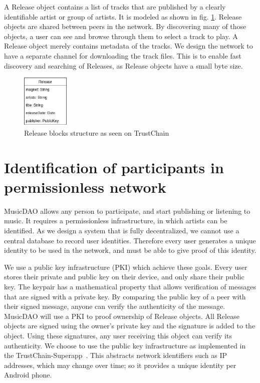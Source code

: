 A Release object contains a list of tracks that are published by a clearly identifiable artist or group of artists. It is modeled as shown in fig. \ref{fig:release-model}. Release objects are shared between peers in the network. By discovering many of those objects, a user can see and browse through them to select a track to play. A Release object merely contains metadata of the tracks. We design the network to have a separate channel for downloading the track files. This is to enable fast discovery and searching of Releases, as Release objects have a small byte size. 
\begin{figure}
    \centering
    \includegraphics[width=0.2\textwidth]{design/release-model.png}
    \caption{Release blocks structure as seen on TrustChain}
    \label{fig:release-model}
\end{figure}

\section{Identification of participants in permissionless network}
\label{sec:pki-design}
MusicDAO allows any person to participate, and start publishing or listening to music. It requires a permissionless infrastructure, in which artists can be identified. As we design a system that is fully decentralized, we cannot use a central database to record user identities. Therefore every user generates a unique identity to be used in the network, and must be able to give proof of this identity. 

We use a public key infrastructure (PKI) which achieve these goals. Every user stores their private and public key on their device, and only share their public key. The keypair has a mathematical property that allows verification of messages that are signed with a private key. By comparing the public key of a peer with their signed message, anyone can verify the authenticity of the message. MusicDAO will use a PKI to proof ownership of Release objects. All Release objects are signed using the owner's private key and the signature is added to the object. Using these signatures, any user receiving this object can verify its authenticity. We choose to use the public key infrastructure as implemented in the TrustChain-Superapp~\citep{mattskala2020}. This abstracts network identifiers such as IP addresses, which may change over time; so it provides a unique identity per Android phone.

